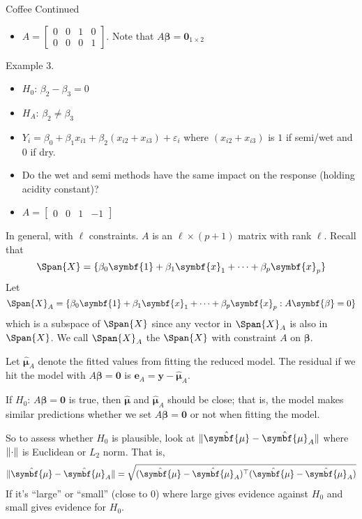 \begin{Example}{Coffee Continued}{}
\begin{itemize}
        \item $ A=\begin{bmatrix}
                      0 & 0 & 1 & 0 \\
                      0 & 0 & 0 & 1
                  \end{bmatrix} $. Note that $ A\symbf{\beta}=\symbf{0}_{1\times 2} $
    \end{itemize}
    Example 3.
    \begin{itemize}
        \item $ H_0 $: $ \beta_2-\beta_3=0 $
        \item $ H_A $: $ \beta_2\neq \beta_3 $
        \item $ Y_i=\beta_0+\beta_1x_{i1}+\beta_2(x_{i2}+x_{i3})+\varepsilon_i $
              where $ (x_{i2}+x_{i3}) $ is
              $ 1 $ if semi/wet and $ 0 $ if dry.
        \item Do the wet and semi methods have the same impact
              on the response (holding acidity constant)?
        \item $ A=\begin{bmatrix}
                      0 & 0 & 1 & -1
                  \end{bmatrix} $
    \end{itemize}
\end{Example}

In general, with $ \ell $ constraints. $ A $
is an $ \ell \times (p+1) $ matrix
with rank $ \ell $. Recall
that
\[ \Span{X}=\set{\beta_0\symbf{1}+\beta_1\symbf{x}_1+
        \cdots+\beta_p\symbf{x}_p} \]
Let
\[ \Span{X}_A=\set{\beta_0\symbf{1}+\beta_1\symbf{x}_1+
        \cdots+\beta_p\symbf{x}_p:A\symbf{\beta}=0} \]
which is a subspace of $ \Span{X} $
since any vector in $ \Span{X}_A $
is also in $ \Span{X} $.
We call $ \Span{X}_A $ the
$ \Span{X} $ with constraint $ A $ on $ \symbf{\beta} $.

Let $ \hat{\symbf{\mu}}_A $
denote the fitted values from fitting the reduced model.
The residual if we hit the model with $ A\symbf{\beta}=\symbf{0} $
is $ \symbf{e}_A=\symbf{y}-\hat{\symbf{\mu}}_A $.

If $ H_0 $: $ A\symbf{\beta}=\symbf{0} $ is true, then
$ \hat{\symbf{\mu}} $ and $ \hat{\symbf{\mu}}_A $ should be close;
that is, the model makes similar predictions whether
we set $ A\symbf{\beta}=\symbf{0} $ or not when fitting the model.

So to assess whether $ H_0 $ is plausible,
look at $ \norm{\hat{\symbf{\mu}}-\hat{\symbf{\mu}}_A} $
where $ \lVert\cdot\rVert $ is Euclidean or $ L_2 $ norm. That is,
\[ \norm{\hat{\symbf{\mu}}-\hat{\symbf{\mu}}_A}=
    \sqrt{(\hat{\symbf{\mu}}-\hat{\symbf{\mu}}_A)^\top(\hat{\symbf{\mu}}-\hat{\symbf{\mu}}_A)} \]
If it's ``large'' or ``small'' (close to 0)
where large gives evidence against $ H_0 $
and small gives evidence for $ H_0 $.

